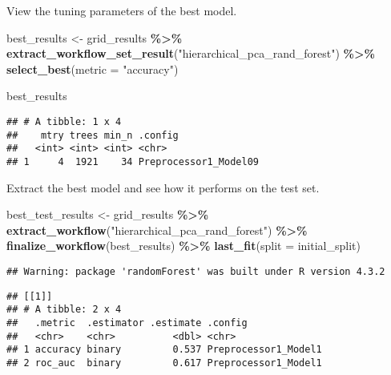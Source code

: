 \documentclass[
]{article}
\newenvironment{Shaded}{\begin{snugshade}}{\end{snugshade}}
\newcommand{\AttributeTok}[1]{\textcolor[rgb]{0.13,0.29,0.53}{#1}}
\newcommand{\FunctionTok}[1]{\textcolor[rgb]{0.13,0.29,0.53}{\textbf{#1}}}
\newcommand{\NormalTok}[1]{#1}
\newcommand{\OtherTok}[1]{\textcolor[rgb]{0.56,0.35,0.01}{#1}}
\newcommand{\SpecialCharTok}[1]{\textcolor[rgb]{0.81,0.36,0.00}{\textbf{#1}}}
\newcommand{\StringTok}[1]{\textcolor[rgb]{0.31,0.60,0.02}{#1}}
\begin{document}
View the tuning parameters of the best model.

\begin{Shaded}
\begin{Highlighting}[]
\NormalTok{best\_results }\OtherTok{\textless{}{-}} 
\NormalTok{  grid\_results }\SpecialCharTok{\%\textgreater{}\%} 
  \FunctionTok{extract\_workflow\_set\_result}\NormalTok{(}\StringTok{"hierarchical\_pca\_rand\_forest"}\NormalTok{) }\SpecialCharTok{\%\textgreater{}\%} 
  \FunctionTok{select\_best}\NormalTok{(}\AttributeTok{metric =} \StringTok{"accuracy"}\NormalTok{)}

\NormalTok{best\_results}
\end{Highlighting}
\end{Shaded}

\begin{verbatim}
## # A tibble: 1 x 4
##    mtry trees min_n .config              
##   <int> <int> <int> <chr>                
## 1     4  1921    34 Preprocessor1_Model09
\end{verbatim}

Extract the best model and see how it performs on the test set.

\begin{Shaded}
\begin{Highlighting}[]
\NormalTok{best\_test\_results }\OtherTok{\textless{}{-}} 
\NormalTok{  grid\_results }\SpecialCharTok{\%\textgreater{}\%} 
  \FunctionTok{extract\_workflow}\NormalTok{(}\StringTok{"hierarchical\_pca\_rand\_forest"}\NormalTok{) }\SpecialCharTok{\%\textgreater{}\%} 
  \FunctionTok{finalize\_workflow}\NormalTok{(best\_results) }\SpecialCharTok{\%\textgreater{}\%} 
  \FunctionTok{last\_fit}\NormalTok{(}\AttributeTok{split =}\NormalTok{ initial\_split)}
\end{Highlighting}
\end{Shaded}

\begin{verbatim}
## Warning: package 'randomForest' was built under R version 4.3.2
\end{verbatim}

\begin{Shaded}
\end{Shaded}

\begin{verbatim}
## [[1]]
## # A tibble: 2 x 4
##   .metric  .estimator .estimate .config             
##   <chr>    <chr>          <dbl> <chr>               
## 1 accuracy binary         0.537 Preprocessor1_Model1
## 2 roc_auc  binary         0.617 Preprocessor1_Model1
\end{verbatim}
\end{document}
